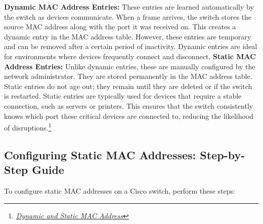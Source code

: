 \documentclass[11pt,a4paper]{article}
\begin{document}
\textbf{Dynamic MAC Address Entries:} These entries are learned automatically by the switch as devices communicate. When a frame arrives, the switch stores the source MAC address along with the port it was received on. This creates a dynamic entry in the MAC address table. However, these entries are temporary and can be removed after a certain period of inactivity. Dynamic entries are ideal for environments where devices frequently connect and disconnect.
\newline
\newline
\textbf{Static MAC Address Entries:} Unlike dynamic entries, these are manually configured by the network administrator. They are stored permanently in the MAC address table. Static entries do not age out; they remain until they are deleted or if the switch is restarted. Static entries are typically used for devices that require a stable connection, such as servers or printers. This ensures that the switch consistently knows which port these critical devices are connected to, reducing the likelihood of disruptions.\footnote{\href{https://learnduty.com/network-techs/dynamic-vs-static-mac-address-explained-configuration/}{\textit{Dynamic and Static MAC Address}}}


\subsection*{Configuring Static MAC Addresses: Step-by-Step Guide}

To configure static MAC addresses on a Cisco switch, perform these steps:
\end{document}
